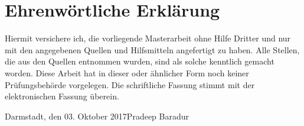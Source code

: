 	\chapter*{Ehrenw\"ortliche Erkl\"arung}
	Hiermit versichere ich, die vorliegende Masterarbeit ohne Hilfe Dritter und nur mit den angegebenen Quellen
    und Hilfsmitteln angefertigt zu haben. Alle Stellen, die aus den Quellen entnommen wurden, sind als solche
    kenntlich gemacht worden. Diese Arbeit hat in dieser oder \"ahnlicher Form noch keiner Pr\"ufungsbeh\"orde vorgelegen.
    Die schriftliche Fassung stimmt mit der elektronischen Fassung \"uberein.
	\vspace{1.5cm}
	
	\noindent Darmstadt, den 03. Oktober 2017\hfill Pradeep Baradur